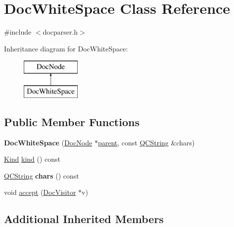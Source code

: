 \hypertarget{class_doc_white_space}{}\section{Doc\+White\+Space Class Reference}
\label{class_doc_white_space}


{\ttfamily \#include $<$docparser.\+h$>$}

Inheritance diagram for Doc\+White\+Space\+:\begin{figure}[H]
\begin{center}
\leavevmode
\includegraphics[height=2.000000cm]{class_doc_white_space}
\end{center}
\end{figure}
\subsection*{Public Member Functions}
\begin{DoxyCompactItemize}
\item 
\mbox{\label{class_doc_white_space_afbeedad7743b79f86b5ababfb2186f71}} 
{\bfseries Doc\+White\+Space} (\mbox{\hyperlink{class_doc_node}{Doc\+Node}} $\ast$\mbox{\hyperlink{class_doc_node_a73e8ad29a91cfceb0968eb00db71a23d}{parent}}, const \mbox{\hyperlink{class_q_c_string}{Q\+C\+String}} \&chars)
\item 
\mbox{\hyperlink{class_doc_node_aebd16e89ca590d84cbd40543ea5faadb}{Kind}} \mbox{\hyperlink{class_doc_white_space_a8cc06255a7e2dc0f4d23567568235410}{kind}} () const
\item 
\mbox{\label{class_doc_white_space_a9e8fbf6c6ca3efa8f4e7d9fce2352023}} 
\mbox{\hyperlink{class_q_c_string}{Q\+C\+String}} {\bfseries chars} () const
\item 
void \mbox{\hyperlink{class_doc_white_space_af3830207874d11f5e9fd193fe875d0fa}{accept}} (\mbox{\hyperlink{class_doc_visitor}{Doc\+Visitor}} $\ast$v)
\end{DoxyCompactItemize}
\subsection*{Additional Inherited Members}


